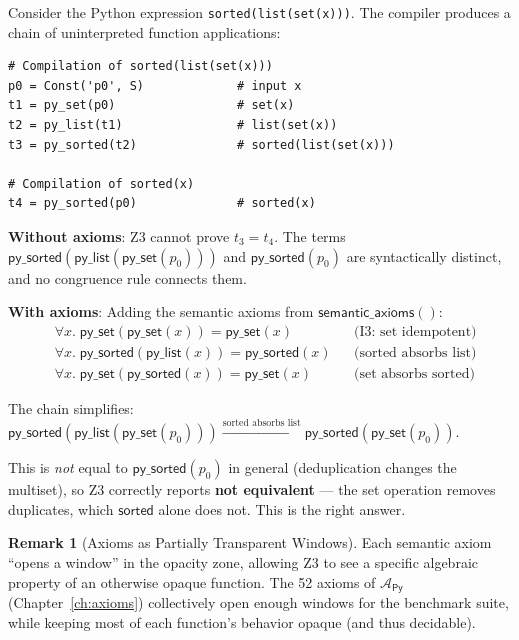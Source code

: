 \documentclass[11pt,a4paper]{report}
\theoremstyle{definition}
\newtheorem{remark}[definition]{Remark}
\theoremstyle{plain}
\begin{document}
Consider the Python expression \texttt{sorted(list(set(x)))}.
The compiler produces a chain of uninterpreted function applications:

\begin{lstlisting}[caption={Uninterpreted function chain}]
# Compilation of sorted(list(set(x)))
p0 = Const('p0', S)             # input x
t1 = py_set(p0)                 # set(x)
t2 = py_list(t1)                # list(set(x))
t3 = py_sorted(t2)              # sorted(list(set(x)))

# Compilation of sorted(x)
t4 = py_sorted(p0)              # sorted(x)
\end{lstlisting}

\textbf{Without axioms}: Z3 cannot prove $t_3 = t_4$.  The terms
$\mathsf{py\_sorted}(\mathsf{py\_list}(\mathsf{py\_set}(p_0)))$
and $\mathsf{py\_sorted}(p_0)$ are syntactically distinct, and
no congruence rule connects them.

\textbf{With axioms}: Adding the semantic axioms from
$\mathsf{semantic\_axioms}()$:
\begin{align}
  &\forall x.\; \mathsf{py\_set}(\mathsf{py\_set}(x)) =
    \mathsf{py\_set}(x)
    && \text{(I3: set idempotent)} \\
  &\forall x.\; \mathsf{py\_sorted}(\mathsf{py\_list}(x)) =
    \mathsf{py\_sorted}(x)
    && \text{(sorted absorbs list)} \\
  &\forall x.\; \mathsf{py\_set}(\mathsf{py\_sorted}(x)) =
    \mathsf{py\_set}(x)
    && \text{(set absorbs sorted)}
\end{align}

The chain simplifies:
$\mathsf{py\_sorted}(\mathsf{py\_list}(\mathsf{py\_set}(p_0)))
\xrightarrow{\text{sorted absorbs list}}
\mathsf{py\_sorted}(\mathsf{py\_set}(p_0))$.

This is \emph{not} equal to $\mathsf{py\_sorted}(p_0)$ in general
(deduplication changes the multiset), so Z3 correctly reports
\textbf{not equivalent} --- the set operation removes duplicates,
which $\mathsf{sorted}$ alone does not.  This is the right answer.

\begin{remark}[Axioms as Partially Transparent Windows]
Each semantic axiom ``opens a window'' in the opacity zone, allowing
Z3 to see a specific algebraic property of an otherwise opaque
function.  The 52 axioms of $\mathcal{A}_\mathsf{Py}$
(Chapter~\ref{ch:axioms}) collectively open enough windows for
the benchmark suite, while keeping most of each function's behavior
opaque (and thus decidable).
\end{remark}
\end{document}
